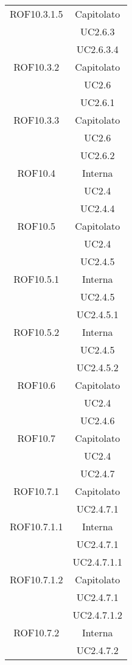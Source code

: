 \begin{longtable}{|c|c|}
\midrule
ROF10.3.1.5
& Capitolato\\
& UC2.6.3\\
& UC2.6.3.4
\\

\midrule
ROF10.3.2
& Capitolato\\
& UC2.6\\
& UC2.6.1
\\

\midrule
ROF10.3.3
& Capitolato\\
& UC2.6\\
& UC2.6.2
\\

\midrule
ROF10.4
& Interna\\
& UC2.4\\
& UC2.4.4
\\

\midrule
ROF10.5
& Capitolato\\
& UC2.4\\
& UC2.4.5
\\

\midrule
ROF10.5.1
& Interna\\
& UC2.4.5\\
& UC2.4.5.1
\\

\midrule
ROF10.5.2
& Interna\\
& UC2.4.5\\
& UC2.4.5.2
\\

\midrule
ROF10.6
& Capitolato\\
& UC2.4\\
& UC2.4.6
\\

\midrule
ROF10.7
& Capitolato\\
& UC2.4\\
& UC2.4.7
\\

\midrule
ROF10.7.1
& Capitolato\\
& UC2.4.7.1
\\

\midrule
ROF10.7.1.1
& Interna\\
& UC2.4.7.1\\
& UC2.4.7.1.1
\\

\midrule
ROF10.7.1.2
& Capitolato\\
& UC2.4.7.1\\
& UC2.4.7.1.2
\\

\midrule
ROF10.7.2
& Interna\\
& UC2.4.7.2
\\


\end{longtable}
